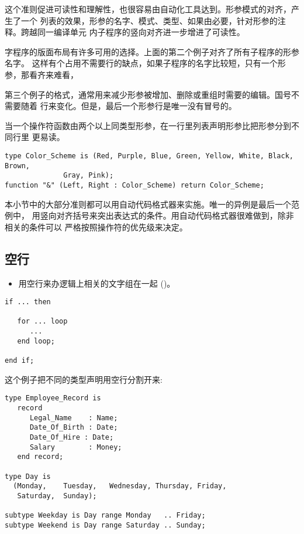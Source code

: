 \begin{blockindent}
这个准则促进可读性和理解性，也很容易由自动化工具达到。形参模式的对齐，产生了一个
列表的效果，形参的名字、模式、类型、如果由必要，针对形参的注释。跨越同一编译单元
内子程序的竖向对齐进一步增进了可读性。
\end{blockindent}

\begin{blockindent}
字程序的版面布局有许多可用的选择。上面的第二个例子对齐了所有子程序的形参名字。
这样有个占用不需要行的缺点，如果子程序的名字比较短，只有一个形参，那看齐来难看，

第三个例子的格式，通常用来减少形参被增加、删除或重组时需要的编辑。国号不需要随着
行来变化。但是，最后一个形参行是唯一没有冒号的。
\end{blockindent}

\begin{blockindent}
当一个操作符函数由两个以上同类型形参，在一行里列表声明形参比把形参分到不同行里
更易读。
\begin{lstlisting}
type Color_Scheme is (Red, Purple, Blue, Green, Yellow, White, Black, Brown,
		      Gray, Pink);
function "&" (Left, Right : Color_Scheme) return Color_Scheme;
\end{lstlisting}
\end{blockindent}

\begin{blockindent}
本小节中的大部分准则都可以用自动代码格式器来实施。唯一的异例是最后一个范例中，
用竖向对齐括号来突出表达式的条件。用自动代码格式器很难做到，除非相关的条件可以
严格按照操作符的优先级来决定。
\end{blockindent}

\subsection{空行}
\begin{itemize}
    \item 用空行来办逻辑上相关的文字组在一起 (\cite{nasa87})。
\end{itemize}

\begin{blockindent}
\noindent
\begin{lstlisting}
if ... then

   for ... loop
      ...
   end loop;

end if;
\end{lstlisting}
这个例子把不同的类型声明用空行分割开来:
\begin{lstlisting}
type Employee_Record is
   record
      Legal_Name    : Name;
      Date_Of_Birth : Date;
      Date_Of_Hire : Date;
      Salary        : Money;
   end record;

type Day is
  (Monday,    Tuesday,   Wednesday, Thursday, Friday,
   Saturday,  Sunday);

subtype Weekday is Day range Monday   .. Friday;
subtype Weekend is Day range Saturday .. Sunday;
\end{lstlisting}
\end{blockindent}

